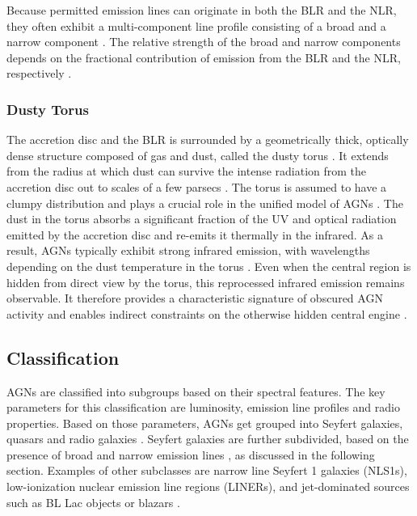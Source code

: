 Because permitted emission lines can originate in both the BLR and the NLR, they often exhibit a multi-component line profile consisting of a broad and a narrow component \parencite{peterson1997introduction}. The relative strength of the broad and narrow components depends on the fractional contribution of emission from the BLR and the NLR, respectively \parencite{peterson1997introduction}.





\subsubsection{Dusty Torus}

The accretion disc and the BLR is surrounded by a geometrically thick, optically dense structure composed of gas and dust, called the dusty torus \parencite{urry1995unified}. It extends from the radius at which dust can survive the intense radiation from the accretion disc out to scales of a few parsecs \parencite{netzer2013agn}. The torus is assumed to have a clumpy distribution and plays a crucial role in the unified model of AGNs \parencite{urry1995unified, netzer2013agn}.
The dust in the torus absorbs a significant fraction of the UV and optical radiation emitted by the accretion disc and re-emits it thermally in the infrared. As a result, AGNs typically exhibit strong infrared emission, with wavelengths depending on the dust temperature in the torus \parencite{netzer2013agn}.
Even when the central region is hidden from direct view by the torus, this reprocessed infrared emission remains observable. It therefore provides a characteristic signature of obscured AGN activity and enables indirect constraints on the otherwise hidden central engine \parencite{netzer2013agn}.





\subsection{Classification}
\label{sec:classification}

AGNs are classified into subgroups based on their spectral features. The key parameters for this classification are luminosity, emission line profiles and radio properties. Based on those parameters, AGNs get grouped into Seyfert galaxies, quasars and radio galaxies \parencite{peterson1997introduction}. Seyfert galaxies are further subdivided, based on the presence of broad and narrow emission lines \parencite{peterson1997introduction}, as discussed in the following section. Examples of other subclasses are narrow line Seyfert 1 galaxies (NLS1s), low-ionization nuclear emission line regions (LINERs), and jet-dominated sources such as BL Lac objects or blazars \parencite{antonucci1993unified, urry1995unified}.


